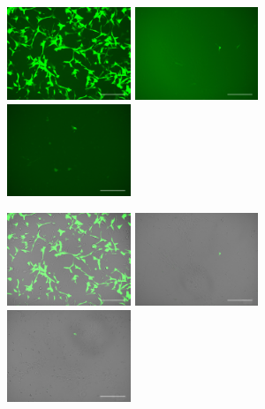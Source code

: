 \documentclass[onecolumn,10pt]{asme2ej}
\begin{document}
\begin{figure}[h]
	\includegraphics[width=0.33\textwidth]{figures/electro/ctrl-elec-g.jpg}
	\includegraphics[width=0.33\textwidth]{figures/electro/G2000(D1).jpg}
	\includegraphics[width=0.33\textwidth]{figures/electro/GMAX(D3).jpg}
	
	\includegraphics[width=0.33\textwidth]{figures/electro/ctrl-elec-m.jpg}
	\includegraphics[width=0.33\textwidth]{figures/electro/Compo2000.jpg}
	\includegraphics[width=0.33\textwidth]{figures/electro/CompoMAX.jpg}




\end{figure}
\end{document}
